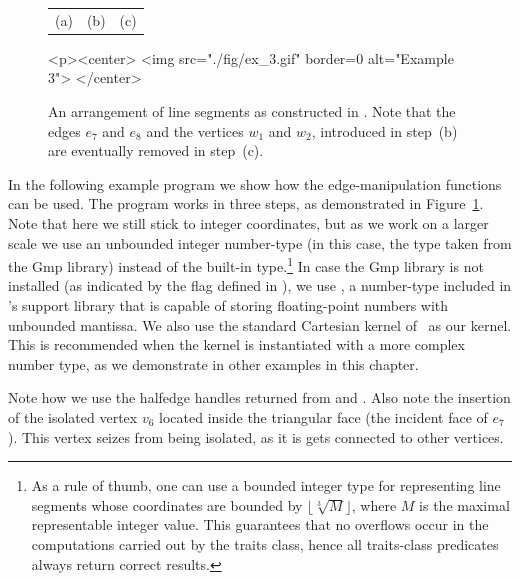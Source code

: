 \begin{figure}[t]
\begin{ccTexOnly}
\begin{center}
\begin{tabular}{ccc}
  {\small (a)} & {\small (b)} & {\small (c)}\\
  \end{tabular}
  \end{center}
\end{ccTexOnly}
\begin{ccHtmlOnly}
  <p><center>
  <img src="./fig/ex_3.gif" border=0 alt="Example 3">
  </center>
\end{ccHtmlOnly}
\caption{An arrangement of line segments as constructed
in . Note that the edges $e_7$ and $e_8$ and the
vertices $w_1$ and $w_2$, introduced in step~(b) are eventually
removed in step~(c).\label{arr_fig:ex_3}}
\end{figure}

In the following example program we show how the edge-manipulation
functions can be used. The program works in three
steps, as demonstrated in Figure~\ref{arr_fig:ex_3}. Note that
here we still stick to integer coordinates, but as we work on a
larger scale we use an unbounded integer number-type (in this
case, the  type taken from the {\sc Gmp} library)
instead of the built-in  type.\footnote{As a rule of
thumb, one can use a bounded integer type for representing line
segments whose coordinates are bounded by
$\lfloor\sqrt[3]{M}\rfloor$, where $M$ is the maximal
representable integer value. This guarantees that no overflows
occur in the computations carried out by the traits class, hence
all traits-class predicates always return correct results.} 
In case the {\sc Gmp} library is not installed (as indicated by
the  flag defined in ), we
use , a number-type included in \cgal's support
library that is capable of storing floating-point numbers with
unbounded mantissa. We also use the standard Cartesian
kernel of \cgal\ as our kernel. This is recommended when the
kernel is instantiated with a more complex number type, as we
demonstrate in other examples in this chapter.


Note how we use the halfedge handles returned from
 and . Also note the insertion
of the isolated vertex $v_6$ located inside the triangular face (the
incident face of $e_7$). This vertex seizes from being isolated, as it
is gets connected to other vertices.

